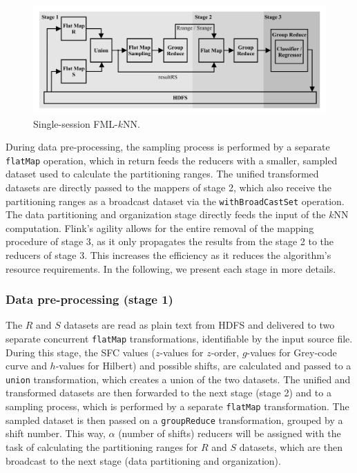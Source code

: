 \begin{figure}[!ht]
	\centering
	\includegraphics[width=\textwidth]{figures/figure4.png}
	\caption{Single-session FML-$k$NN.}
	\label{figure4}
\end{figure}

During data pre-processing, the sampling process is performed by a separate \texttt{flatMap} operation, which in return feeds the reducers with a smaller, sampled dataset used to calculate the partitioning ranges. The unified transformed datasets are directly passed to the mappers of stage 2, which also receive the partitioning ranges as a broadcast dataset via the \texttt{withBroadCastSet} operation. The data partitioning and organization stage directly feeds the input of the $k$NN computation. Flink's agility allows for the entire removal of the mapping procedure of stage 3, as it only propagates the results from the stage 2 to the reducers of stage 3. This increases the efficiency as it reduces the algorithm's resource requirements. In the following, we present each stage in more details.

\subsubsection{Data pre-processing (stage 1)}
\label{par:algorithmic1}
The $R$ and $S$ datasets are read as plain text from HDFS and delivered to two separate concurrent \texttt{flatMap} transformations, identifiable by the input source file. During this stage, the SFC values ($z$-values for $z$-order, $g$-values for Grey-code curve and $h$-values for Hilbert) and possible shifts, are calculated and passed to a \texttt{union} transformation, which creates a union of the two datasets. The unified and transformed datasets are then forwarded to the next stage (stage 2) and to a sampling process, which is performed by a separate \texttt{flatMap} transformation. The sampled dataset is then passed on a \texttt{groupReduce} transformation, grouped by a shift number. This way, $\alpha$ (number of shifts) reducers will be assigned with the task of calculating the partitioning ranges for $R$ and $S$ datasets, which are then broadcast to the next stage (data partitioning and organization). 

